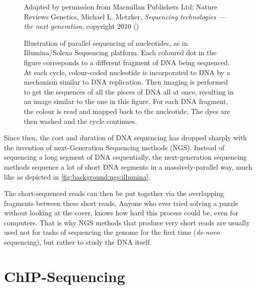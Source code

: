 \documentclass[parskip]{cs4rep}
\begin{document}
    
\begin{figure}
    \centering
    {Adapted by permission from Macmillan Publishers Ltd: Nature Reviews Genetics,
     Michael L. Metzker, \emph{Sequencing technologies — the next generation}, copyright 2010 (\cite{Metzker:j6NWuwFp})}
    \caption{Illustration of parallel sequencing of nucleotides, as in Illumina/Solexa Sequencing platform.
    Each coloured dot in the figure corresponds to a different fragment of DNA being sequenced. 
    At each cycle, colour-coded nucleotide is incorporated to DNA by a mechanism similar to DNA replication. Then imaging is performed to get the sequences of all the pieces of DNA all at once, resulting in an image similar to the one in this figure. For each DNA fragment, the colour is read and mapped back to the nucleotide. The dyes are then washed and the cycle continues\cite{Metzker:j6NWuwFp}.}
    \label{fig:background:ngs:illumina}
\end{figure}

Since then, the cost and duration of DNA sequencing has dropped sharply with the invention of
next-Generation Sequencing methods (NGS). Instead of sequencing a long segment of DNA sequentially,
the next-generation sequencing methods sequence a lot of short DNA segments in a massively-parallel way, much like as depicted in \autoref{fig:background:ngs:illumina}.

The short-sequenced reads can then be put together via the overlapping fragments between these short reads. Anyone who ever tried solving a puzzle without looking at the cover, knows how hard this process could be, even for computers. That is why NGS methods that produce very short reads are usually used not for tasks of sequencing the genome for the first time (\emph{de-novo} sequencing), but
rather to study the DNA itself.

\section{ChIP-Sequencing}
\end{document}
